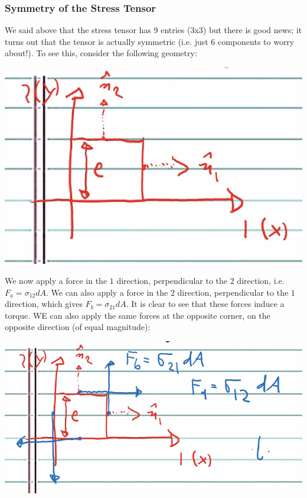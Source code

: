 \documentclass[../PHYS306Notes.tex]{subfiles}
\begin{document}
\subsubsection{Symmetry of the Stress Tensor}
We said above that the stress tensor has 9 entries (3x3) but there is good news; it turns out that the tensor is actually symmetric (i.e. just 6 components to worry about!). To see this, consider the following geometry:
\begin{center}
    \includegraphics[scale=0.8]{Lecture-31/l31-img1.png}
\end{center}
We now apply a force in the $1$ direction, perpendicular to the $2$ direction, i.e. $F_{a} = \sigma_{12}dA$. We can also apply a force in the $2$ direction, perpendicular to the $1$ direction, which gives $F_b = \sigma_{21}dA$. It is clear to see that these forces induce a torque. WE can also apply the same forces at the opposite corner, on the opposite direction (of equal magnitude):
\begin{center}
    \includegraphics[scale=0.8]{Lecture-31/l31-img2.png}
\end{center}
\end{document}
